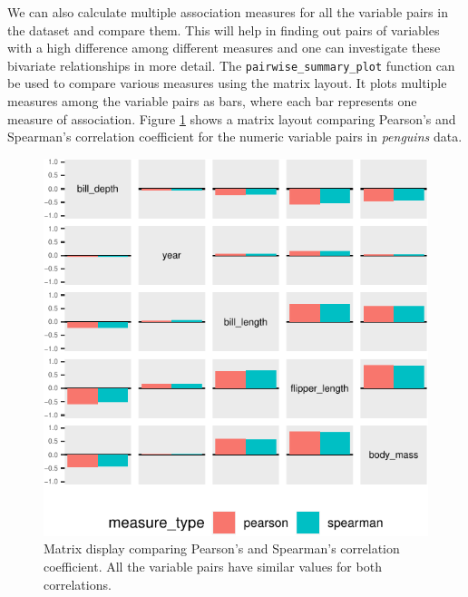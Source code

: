 We can also calculate multiple association measures for all the variable
pairs in the dataset and compare them. This will help in finding out
pairs of variables with a high difference among different measures and
one can investigate these bivariate relationships in more detail. The
\texttt{pairwise\_summary\_plot} function can be used to compare various
measures using the matrix layout. It plots multiple measures among the
variable pairs as bars, where each bar represents one measure of
association. Figure \ref{fig:compare-matrix} shows a matrix layout
comparing Pearson's and Spearman's correlation coefficient for the
numeric variable pairs in \emph{penguins} data.

\begin{Schunk}
\begin{figure}

{\centering \includegraphics{rj_paper_files/figure-latex/compare-matrix-1} 

}

\caption[Matrix display comparing Pearson's and Spearman's correlation coefficient]{Matrix display comparing Pearson's and Spearman's correlation coefficient. All the variable pairs have similar values for both correlations.}\label{fig:compare-matrix}
\end{figure}
\end{Schunk}

